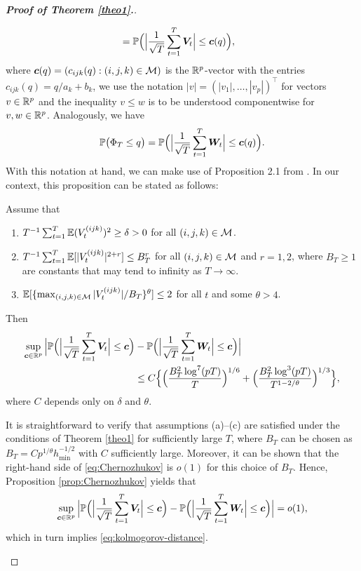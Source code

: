 \documentclass[a4paper,12pt]{article}
\numberwithin{equation}{section}
\begin{document}
\begin{proof}[\textnormal{\textbf{Proof of Theorem \ref{theo1}.}}]
\begin{enumerate}[label=\textit{Step \arabic*.}, leftmargin=0cm, itemindent=1.45cm]
\begin{align*}
 & = \mathbb{P} \Big( \Big|\frac{1}{\sqrt{T}} \sum_{t=1}^T \boldsymbol{V}_t\Big| \le \boldsymbol{c}(q) \Big),
\end{align*} 
where $\boldsymbol{c}(q) = (c_{ijk}(q): (i,j,k) \in \mathcal{M})$ is the $\mathbb{R}^p$-vector with the entries $c_{ijk}(q) = q/a_k + b_k$, we use the notation $|v| = (|v_1|,\ldots,|v_p|)^\top$ for vectors $v \in \mathbb{R}^p$ and the inequality $v \le w$ is to be understood componentwise for $v,w \in \mathbb{R}^p$. Analogously, we have  
\[ \mathbb{P} \big( \Phi_T \le q \big) = \mathbb{P} \Big( \Big|\frac{1}{\sqrt{T}} \sum_{t=1}^T \boldsymbol{W}_t\Big| \le \boldsymbol{c}(q) \Big). \]
With this notation at hand, we can make use of Proposition 2.1 from \cite{Chernozhukov2017}. In our context, this proposition can be stated as follows: 
\begin{propA}\label{prop:Chernozhukov}
Assume that 
\begin{enumerate}[label=(\alph*),leftmargin=0.7cm]
\item $T^{-1} \sum_{t=1}^T \mathbb{E} (V^{(ijk)}_t)^2 \ge \delta > 0$ for all $(i,j,k) \in \mathcal{M}$.
\item $T^{-1} \sum_{t=1}^T \mathbb{E}[ |V^{(ijk)}_t|^{2+r} ] \le B_T^r$ for all $(i,j,k) \in \mathcal{M}$ and $r=1,2$, where $B_T \ge 1$ are constants that may tend to infinity as $T \rightarrow \infty$.  
\item $\mathbb{E}[ \{ \max_{(i,j,k) \in \mathcal{M}} |V^{(ijk)}_t| / B_T \}^\theta ] \le 2$ for all $t$ and some $\theta > 4$.  
\end{enumerate}
Then  
\begin{align}
\sup_{\boldsymbol{c} \in \mathbb{R}^p} \Big| \mathbb{P} \Big( \Big|\frac{1}{\sqrt{T}} \sum_{t=1}^T \boldsymbol{V}_t\Big| \le \boldsymbol{c} \Big) & - \mathbb{P} \Big( \Big|\frac{1}{\sqrt{T}} \sum_{t=1}^T \boldsymbol{W}_t\Big| \le \boldsymbol{c} \Big) \Big| \nonumber \\ & \le C \Big\{ \Big( \frac{B_T^2 \log^7(pT)}{T} \Big)^{1/6} + \Big( \frac{B_T^2 \log^3(pT)}{T^{1-2/\theta}} \Big)^{1/3} \Big\}, \label{eq:Chernozhukov}
\end{align}
where $C$ depends only on $\delta$ and $\theta$. 
\end{propA}
It is straightforward to verify that assumptions (a)--(c) are satisfied under the conditions of Theorem \ref{theo1} for sufficiently large $T$, where $B_T$ can be chosen as $B_T = C p^{1/\theta} h_{\min}^{-1/2}$ with $C$ sufficiently large. Moreover, it can be shown that the right-hand side of \eqref{eq:Chernozhukov} is $o(1)$ for this choice of $B_T$. Hence, Proposition \ref{prop:Chernozhukov} yields that 
\[ \sup_{\boldsymbol{c} \in \mathbb{R}^p} \Big| \mathbb{P} \Big( \Big|\frac{1}{\sqrt{T}} \sum_{t=1}^T \boldsymbol{V}_t\Big| \le \boldsymbol{c} \Big) - \mathbb{P} \Big( \Big|\frac{1}{\sqrt{T}} \sum_{t=1}^T \boldsymbol{W}_t\Big| \le \boldsymbol{c} \Big) \Big| = o(1), \]
which in turn implies \eqref{eq:kolmogorov-distance}. 



\end{enumerate}
\end{proof}
\end{document}

